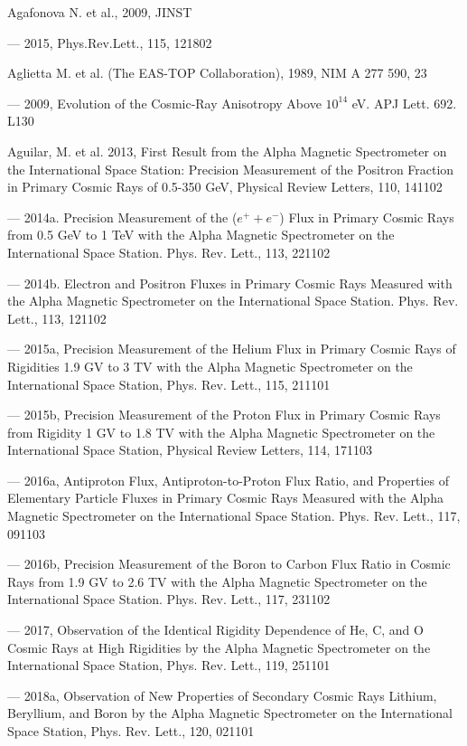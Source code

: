 Agafonova N. et al., 2009, JINST

--- 2015, Phys.Rev.Lett., 115, 121802

Aglietta M. et al. (The EAS-TOP Collaboration), 1989, NIM A 277 590, 23

--- 2009, Evolution of the Cosmic-Ray Anisotropy Above $10^{14}$ eV. APJ Lett. 692. L130 

Aguilar, M. et al. 2013, First Result from the Alpha Magnetic Spectrometer on the International Space Station: Precision Measurement of the Positron Fraction in Primary Cosmic Rays of 0.5-350 GeV, Physical Review Letters, 110, 141102

--- 2014a. Precision Measurement of the ($e^+ + e^-$) Flux in Primary Cosmic Rays from 0.5 GeV to 1 TeV with the Alpha Magnetic Spectrometer on the International Space Station. Phys. Rev. Lett., 113, 221102

--- 2014b. Electron and Positron Fluxes in Primary Cosmic Rays Measured with the Alpha Magnetic Spectrometer on the International Space Station. Phys. Rev. Lett., 113, 121102

--- 2015a, Precision Measurement of the Helium Flux in Primary Cosmic Rays of Rigidities 1.9 GV to 3 TV with the Alpha Magnetic Spectrometer on the International Space Station, Phys. Rev. Lett., 115, 211101

--- 2015b, Precision Measurement of the Proton Flux in Primary Cosmic Rays from Rigidity 1 GV to 1.8 TV with the Alpha Magnetic Spectrometer on the International Space Station, Physical Review Letters, 114, 171103

--- 2016a, Antiproton Flux, Antiproton-to-Proton Flux Ratio, and Properties of Elementary Particle Fluxes in Primary Cosmic Rays Measured with the Alpha Magnetic Spectrometer on the International Space Station. Phys. Rev. Lett., 117, 091103

--- 2016b, Precision Measurement of the Boron to Carbon Flux Ratio in Cosmic Rays from 1.9 GV to 2.6 TV with the Alpha Magnetic Spectrometer on the International Space Station. Phys. Rev. Lett., 117, 231102

--- 2017, Observation of the Identical Rigidity Dependence of He, C, and O Cosmic Rays at High Rigidities by the Alpha Magnetic Spectrometer on the International Space Station, Phys. Rev. Lett., 119, 251101

--- 2018a, Observation of New Properties of Secondary Cosmic Rays Lithium, Beryllium, and Boron by the Alpha Magnetic Spectrometer on the International Space Station, Phys. Rev. Lett., 120, 021101

